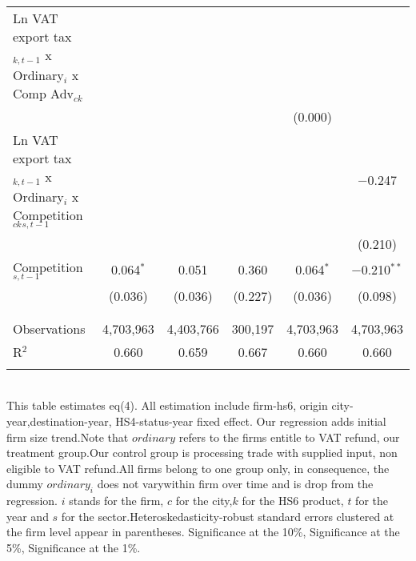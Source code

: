 \documentclass[preview]{standalone}
\begin{document}
\begin{table}[!htbp]
\begin{adjustbox}{width=\textwidth, totalheight=\baselineskip,keepaspectratio}
\begin{tabular}{@{\extracolsep{5pt}}lccccc}
  Ln VAT export tax$_{k,t-1}$ x Ordinary$_{i}$ x Comp Adv$_{ck}$ &  &  &  &  &  \\ 
  &  &  &  & (0.000) &  \\ 
  Ln VAT export tax$_{k,t-1}$ x Ordinary$_{i}$ x Competition$_{ck}$$_{s,t-1}$ &  &  &  &  & $-$0.247 \\ 
  &  &  &  &  & (0.210) \\ 
  Competition$_{s,t-1}$ & 0.064$^{*}$ & 0.051 & 0.360 & 0.064$^{*}$ & $-$0.210$^{**}$ \\ 
  & (0.036) & (0.036) & (0.227) & (0.036) & (0.098) \\ 
 \hline \\[-1.8ex] 
 &  &  &  &  &  \\ 
Observations & 4,703,963 & 4,403,766 & 300,197 & 4,703,963 & 4,703,963 \\ 
R$^{2}$ & 0.660 & 0.659 & 0.667 & 0.660 & 0.660 \\ 
\hline 
\hline \\[-1.8ex] 
\end{tabular}
\end{adjustbox}
\begin{tablenotes} 
 \small 
 \item \\ 
This table estimates eq(4). All estimation include firm-hs6, origin city-year,destination-year, HS4-status-year fixed effect. Our regression adds initial firm size trend.Note that $ordinary$ refers to the firms entitle to VAT refund, our treatment group.Our control group is processing trade with supplied input, non eligible to VAT refund.All firms belong to one group only, in consequence, the dummy $ordinary_{i}$ does not varywithin firm over time and is drop from the regression. $i$ stands for the firm, $c$ for the city,$k$ for the HS6 product, $t$ for the year and $s$ for the sector.Heteroskedasticity-robust standard errors clustered at the firm level appear in parentheses. \sym{*} Significance at the 10\%, \sym{**} Significance at the 5\%, \sym{***} Significance at the 1\%. 
\end{tablenotes}
\end{table}
\end{document}
